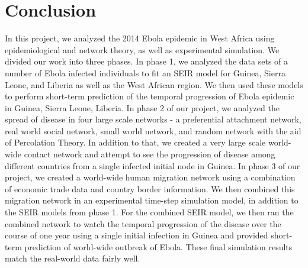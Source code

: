 \documentclass[10pt, journal,onecolumn]{IEEEtran}
\begin{document}
\section{Conclusion} In this project, we analyzed the 2014 Ebola epidemic in West Africa using
epidemiological and network theory, as well as experimental simulation.
We divided our work into three phases. In phase 1, we analyzed
the data sets of a number of Ebola infected individuals to fit an SEIR model for Guinea, Sierra Leone, and
Liberia as well as the West African region. We then used these models to perform short-term
prediction of the temporal progression of Ebola epidemic in Guinea, Sierra Leone, Liberia. In phase 2
of our project, we analyzed the spread of disease in four large scale networks - a  preferential
attachment network, real world social network, small world network, and random network with the aid
of Percolation Theory. In addition to that, we created a very large scale world-wide contact network
and attempt to see the progression of disease among different countries from a single infected
initial node in Guinea. In phase 3 of our project, we created a world-wide human migration network
using a combination of economic trade data and country border information. We then combined this
migration network in an experimental time-step simulation model, in addition to the SEIR models from phase 1.
For the combined SEIR model, we then ran the combined network to watch the
temporal progression of the disease over the course of one year using a single initial infection in
Guinea and provided short-term prediction of world-wide outbreak of Ebola. These final simulation results
match the real-world data fairly well.





\end{document}
